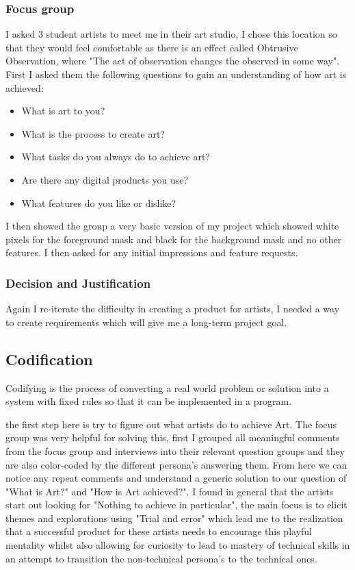 \documentclass[a4paper]{report}
\begin{document}
\subsubsection{Focus group}
I asked 3 student artists to meet me in their art studio, I chose this location so that they would feel comfortable as there is an effect called Obtrusive Observation, where "The act of observation changes the observed in some way"\cite{UX}. First I asked them the following questions to gain an understanding of how art is achieved:

\begin{itemize}
\item What is art to you?
\item What is the process to create art?
\item What tasks do you always do to achieve art?
\item Are there any digital products you use?
\item What features do you like or dislike?
\end{itemize}

I then showed the group a very basic version of my project which showed white pixels for the foreground mask and black for the background mask and no other features. I then asked for any initial impressions and feature requests.

\subsubsection{Decision and Justification}
Again I re-iterate the difficulty in creating a product for artists, I needed a way to create requirements which will give me a long-term project goal.

\subsection{Codification}
Codifying is the process of converting a real world problem or solution into a system with fixed rules so that it can be implemented in a program. 

the first step here is try to figure out what artists do to achieve Art. The focus group was very helpful for solving this, first I grouped all meaningful comments from the focus group and interviews into their relevant question groups and they are also color-coded by the different persona's answering them. From here we can notice any repeat comments and understand a generic solution to our question of "What is Art?" and "How is Art achieved?". I found in general that the artists start out looking for "Nothing to achieve in particular", the main focus is to elicit themes and explorations using "Trial and error" which lead me to the realization that a successful product for these artists needs to encourage this playful mentality whilst also allowing for curiosity to lead to mastery of technical skills in an attempt to transition the non-technical persona's to the technical ones. 
\end{document}
